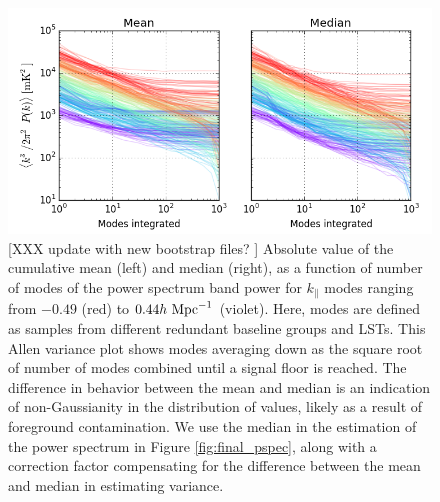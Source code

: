 \documentclass[twocolumn,numberedappendix]{emulateapj} \shorttitle{PSA64}
\newcommand{\hMpci}{h\ {\rm Mpc}^{-1}}
\begin{document}
\begin{figure}\centering
\includegraphics[width=1.8\columnwidth]{plots/pspec_variance.png}
\caption{
[XXX update with new bootstrap files? ]
Absolute value of the cumulative mean (left) and median (right), as a function of number of modes 
of the power spectrum band power for
$k_\parallel$ modes ranging from $-0.49$ (red) to $0.44\hMpci$ (violet).
Here, modes are defined as samples from different redundant baseline groups and LSTs.
This Allen variance plot shows modes averaging down as the square root of
number of modes combined until a signal floor is reached.  The difference in
behavior between the mean and median is an indication of non-Gaussianity
in the distribution of values, likely as a result of foreground contamination.
We use the median in the estimation of the power spectrum in Figure \ref{fig:final_pspec},
along with a correction factor compensating for the difference between the mean and median
in estimating variance.
}\label{fig:pspec_variance}
\end{figure}
\end{document}
